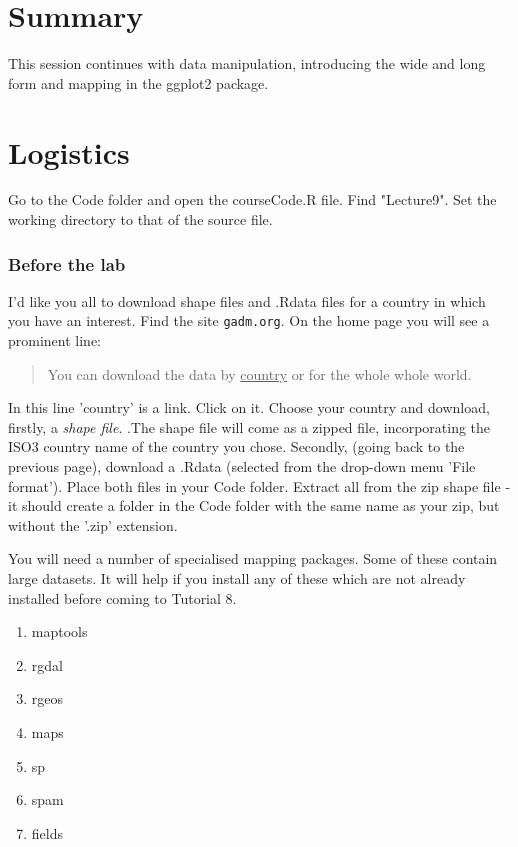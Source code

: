 \documentclass[titlepage]{book}\usepackage{knitr}
\begin{document}
\section{Summary}
This session continues with data manipulation, introducing the wide and long form and mapping in the ggplot2 package.

\section{Logistics} 

Go to the Code folder and open the courseCode.R file.  Find "Lecture9".
Set the working directory to that of the source file.


\subsubsection{Before the lab}

I'd like you all to download shape files and .Rdata files for a country in which you have an interest.
Find the site \texttt{gadm.org}. On the home page you will see a prominent line: 
\begin{quote}
\item {You can download the data by \underline{country} or for the whole whole world.}
\end{quote}
In this line 'country' is a link. Click on it.
Choose your country and download, firstly, a \emph{shape file}. .The shape file will come as a zipped file, incorporating the ISO3 country name of the country you chose. Secondly, (going back to the previous page), download a .Rdata (selected from the drop-down menu 'File format'). Place both files in your Code folder.
Extract all from the zip shape file - it should create a folder in the Code folder with the same name as your zip, but without the '.zip' extension.

You will need a number of specialised mapping packages. Some of these contain large datasets.  It will help if you install any of these which are not already installed  before coming to Tutorial 8.
\begin{enumerate}
\item maptools
\item rgdal
\item rgeos
\item maps 
\item sp
\item spam
\item fields
\end{enumerate}
\end{document}
